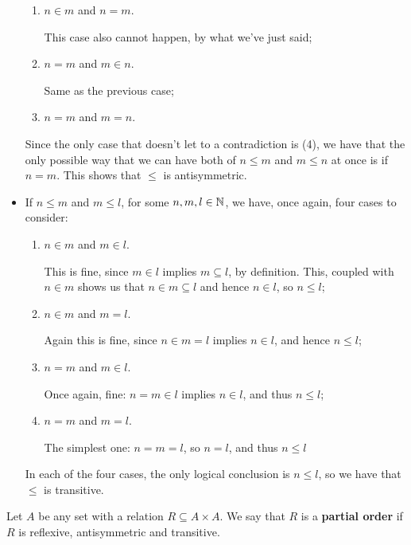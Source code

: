 \begin{ex}
\begin{itemize}
\begin{enumerate}
		\item $n\in m$ and $n=m$.
		
		This case also cannot happen, by what we've just said;
		
		\item $n=m$ and $m\in n$.
		
		Same as the previous case;
		
		\item $n=m$ and $m=n$.
	\end{enumerate}

	Since the only case that doesn't let to a contradiction is (4), we have that the only possible way that we can have both of $n\leq m$ and $m\leq n$ at once is if $n=m$. This shows that $\leq$ is antisymmetric.
	
	\item If $n\leq m$ and $m\leq l$, for some $n,m,l\in \mathbb N$, we have, once again, four cases to consider:
	\begin{enumerate}
		\item $n\in m$ and $m\in l$.
		
		This is fine, since $m\in l$ implies $m\subseteq l$, by definition. This, coupled with $n\in m$ shows us that $n\in m\subseteq l$ and hence $n\in l$, so $n\leq l$;
		
		\item $n\in m$ and $m=l$.
		
		Again this is fine, since $n\in m=l$ implies $n\in l$, and hence $n\leq l$;
		
		\item $n=m$ and $m\in l$.
		
		Once again, fine: $n=m\in l$ implies $n\in l$, and thus $n\leq l$;
		
		\item $n=m$ and $m=l$.
		
		The simplest one: $n=m=l$, so $n=l$, and thus $n\leq l$
	\end{enumerate}

	In each of the four cases, the only logical conclusion is $n\leq l$, so we have that $\leq $ is transitive.
\end{itemize}
\end{ex}

\begin{df}
	Let $A$ be any set with a relation $R\subseteq A\times A$. We say that $R$ is a \textbf{partial order} if $R$ is reflexive, antisymmetric and transitive.
\end{df}

